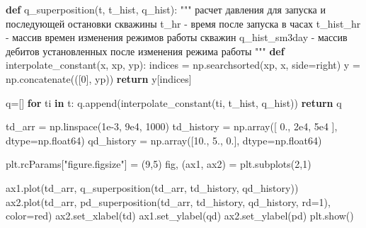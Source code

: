 \documentclass[
  russian,
  letterpaper,
  DIV=11,
  numbers=noendperiod,
  oneside]{scrartcl}
\newenvironment{Shaded}{\begin{snugshade}}{\end{snugshade}}
\newcommand{\CommentTok}[1]{\textcolor[rgb]{0.37,0.37,0.37}{#1}}
\newcommand{\ControlFlowTok}[1]{\textcolor[rgb]{0.00,0.23,0.31}{\textbf{#1}}}
\newcommand{\DecValTok}[1]{\textcolor[rgb]{0.68,0.00,0.00}{#1}}
\newcommand{\FloatTok}[1]{\textcolor[rgb]{0.68,0.00,0.00}{#1}}
\newcommand{\KeywordTok}[1]{\textcolor[rgb]{0.00,0.23,0.31}{\textbf{#1}}}
\newcommand{\NormalTok}[1]{\textcolor[rgb]{0.00,0.23,0.31}{#1}}
\newcommand{\OperatorTok}[1]{\textcolor[rgb]{0.37,0.37,0.37}{#1}}
\newcommand{\StringTok}[1]{\textcolor[rgb]{0.13,0.47,0.30}{#1}}
\begin{document}
\begin{Shaded}
\begin{Highlighting}[]
\KeywordTok{def}\NormalTok{ q\_superposition(t, t\_hist, q\_hist):}
    \CommentTok{"""}
\CommentTok{    расчет давления для запуска и последующей остановки скважины}
\CommentTok{    t\_hr {-} время после запуска в часах}
\CommentTok{    t\_hist\_hr {-} массив времен изменения режимов работы скважин}
\CommentTok{    q\_hist\_sm3day {-} массив дебитов установленных после изменения режима работы}
\CommentTok{    """}
    \KeywordTok{def}\NormalTok{ interpolate\_constant(x, xp, yp):}
\NormalTok{        indices }\OperatorTok{=}\NormalTok{ np.searchsorted(xp, x, side}\OperatorTok{=}\StringTok{\textquotesingle{}right\textquotesingle{}}\NormalTok{)}
\NormalTok{        y }\OperatorTok{=}\NormalTok{ np.concatenate(([}\DecValTok{0}\NormalTok{], yp))}
        \ControlFlowTok{return}\NormalTok{ y[indices]}

\NormalTok{    q}\OperatorTok{=}\NormalTok{[]}
    \ControlFlowTok{for}\NormalTok{ ti }\KeywordTok{in}\NormalTok{ t:}
\NormalTok{        q.append(interpolate\_constant(ti, t\_hist, q\_hist))}
    \ControlFlowTok{return}\NormalTok{ q}
\end{Highlighting}
\end{Shaded}

\begin{Shaded}
\begin{Highlighting}[]
\NormalTok{td\_arr }\OperatorTok{=}\NormalTok{ np.linspace(}\FloatTok{1e{-}3}\NormalTok{, }\FloatTok{9e4}\NormalTok{, }\DecValTok{1000}\NormalTok{)}
\NormalTok{td\_history }\OperatorTok{=}\NormalTok{ np.array([ }\FloatTok{0.}\NormalTok{, }\FloatTok{2e4}\NormalTok{, }\FloatTok{5e4}\NormalTok{ ], dtype}\OperatorTok{=}\NormalTok{np.float64) }
\NormalTok{qd\_history }\OperatorTok{=}\NormalTok{ np.array([}\FloatTok{10.}\NormalTok{, }\FloatTok{5.}\NormalTok{, }\FloatTok{0.}\NormalTok{], dtype}\OperatorTok{=}\NormalTok{np.float64)}

\NormalTok{plt.rcParams[}\StringTok{"figure.figsize"}\NormalTok{] }\OperatorTok{=}\NormalTok{ (}\DecValTok{9}\NormalTok{,}\DecValTok{5}\NormalTok{)}
\NormalTok{fig, (ax1, ax2) }\OperatorTok{=}\NormalTok{ plt.subplots(}\DecValTok{2}\NormalTok{,}\DecValTok{1}\NormalTok{)}

\NormalTok{ax1.plot(td\_arr, }
\NormalTok{         q\_superposition(td\_arr, td\_history, qd\_history)) }
\NormalTok{ax2.plot(td\_arr, }
\NormalTok{         pd\_superposition(td\_arr, td\_history, qd\_history, rd}\OperatorTok{=}\DecValTok{1}\NormalTok{), }
\NormalTok{         color}\OperatorTok{=}\StringTok{\textquotesingle{}red\textquotesingle{}}\NormalTok{) }
\NormalTok{ax2.set\_xlabel(}\StringTok{\textquotesingle{}td\textquotesingle{}}\NormalTok{)}
\NormalTok{ax1.set\_ylabel(}\StringTok{\textquotesingle{}qd\textquotesingle{}}\NormalTok{)}
\NormalTok{ax2.set\_ylabel(}\StringTok{\textquotesingle{}pd\textquotesingle{}}\NormalTok{)}
\NormalTok{plt.show()}
\end{Highlighting}
\end{Shaded}
\end{document}
